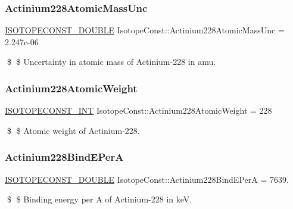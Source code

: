 \subsubsection{\texorpdfstring{Actinium228\+Atomic\+Mass\+Unc}{Actinium228AtomicMassUnc}}
{\footnotesize\ttfamily \mbox{\hyperlink{group___isotope_const-_macros_ga8f45a7272ce02c0b4c65c44636ed719a}{I\+S\+O\+T\+O\+P\+E\+C\+O\+N\+S\+T\+\_\+\+D\+O\+U\+B\+LE}} Isotope\+Const\+::\+Actinium228\+Atomic\+Mass\+Unc = 2.\+247e-\/06}

\$ \$ Uncertainty in atomic mass of Actinium-\/228 in amu. \mbox{\label{group___isotope_const-_actinium-_ac228_gafb55e0f2769678dc06f6cce9fcfa4c7c}} 
\subsubsection{\texorpdfstring{Actinium228\+Atomic\+Weight}{Actinium228AtomicWeight}}
{\footnotesize\ttfamily \mbox{\hyperlink{group___isotope_const-_macros_ga5f18360b3e99483a35c32d789e62621c}{I\+S\+O\+T\+O\+P\+E\+C\+O\+N\+S\+T\+\_\+\+I\+NT}} Isotope\+Const\+::\+Actinium228\+Atomic\+Weight = 228}

\$ \$ Atomic weight of Actinium-\/228. \mbox{\label{group___isotope_const-_actinium-_ac228_ga0b163905ca13899e507c183f6c791d9e}} 
\subsubsection{\texorpdfstring{Actinium228\+Bind\+E\+PerA}{Actinium228BindEPerA}}
{\footnotesize\ttfamily \mbox{\hyperlink{group___isotope_const-_macros_ga8f45a7272ce02c0b4c65c44636ed719a}{I\+S\+O\+T\+O\+P\+E\+C\+O\+N\+S\+T\+\_\+\+D\+O\+U\+B\+LE}} Isotope\+Const\+::\+Actinium228\+Bind\+E\+PerA = 7639.}

\$ \$ Binding energy per A of Actinium-\/228 in keV. \mbox{\label{group___isotope_const-_actinium-_ac228_ga620661e9c605adc813229b7bd9bd5c71}} 
